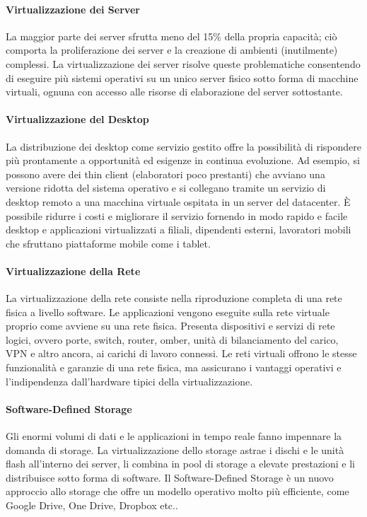 \documentclass[a4paper]{report}
\begin{document}
\paragraph{Virtualizzazione dei Server} La maggior parte dei server sfrutta meno del 15\% della propria capacità; ciò comporta la proliferazione dei server e la creazione di ambienti (inutilmente) complessi. La virtualizzazione dei server risolve queste problematiche consentendo di eseguire più sistemi operativi su un unico server fisico sotto forma di macchine virtuali, ognuna con accesso alle risorse di elaborazione del server sottostante.\\
\paragraph{Virtualizzazione del Desktop} La distribuzione dei desktop come servizio gestito offre la possibilità di rispondere più prontamente a opportunità ed esigenze in continua evoluzione. Ad esempio, si possono avere dei thin client (elaboratori poco prestanti) che avviano una versione ridotta del sistema operativo e si collegano tramite un servizio di desktop remoto a una macchina virtuale ospitata in un server del datacenter. È possibile ridurre i costi e migliorare il servizio fornendo in modo rapido e facile desktop e applicazioni virtualizzati a filiali, dipendenti esterni, lavoratori mobili che sfruttano piattaforme mobile come i tablet.\\
\paragraph{Virtualizzazione della Rete} La virtualizzazione della rete consiste nella riproduzione completa di una rete fisica a livello software. Le applicazioni vengono eseguite sulla rete virtuale proprio come avviene su una rete fisica. Presenta dispositivi e servizi di rete logici, ovvero porte, switch, router, omber, unità di bilanciamento del carico, VPN e altro ancora, ai carichi di lavoro connessi. Le reti virtuali offrono le stesse funzionalità e garanzie di una rete fisica, ma assicurano i vantaggi operativi e l'indipendenza dall'hardware tipici della virtualizzazione.\\
\paragraph{Software-Defined Storage} Gli enormi volumi di dati e le applicazioni in tempo reale fanno impennare la domanda di storage. La virtualizzazione dello storage astrae i dischi e le unità flash all'interno dei server, li combina in pool di storage a elevate prestazioni e li distribuisce sotto forma di software. Il Software-Defined Storage è un nuovo approccio allo storage che offre un modello operativo molto più efficiente, come Google Drive, One Drive, Dropbox etc..\\
\end{document}
